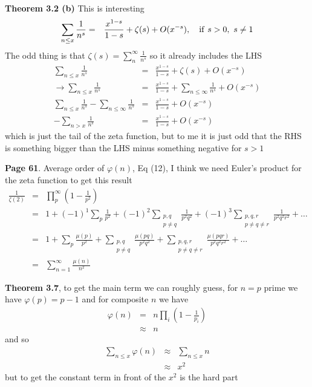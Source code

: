 \documentclass[aps,preprint,preprintnumbers,nofootinbib,showpacs,prd]{revtex4-1}
\newcommand{\nbea}{\begin{eqnarray*}}
\newcommand{\neea}{\end{eqnarray*}}
\begin{document}
{\bf Theorem 3.2 (b)} This is interesting
%
\nbea
\sum_{n\le x}\frac{1}{n^s} & = & \frac{x^{1-s}}{1-s} + \zeta(s) + O(x^{-s}), ~~~{\rm if~} s> 0,~s\neq1
\neea
%
The odd thing is that $\zeta(s) = \sum_{n}^\infty \frac{1}{n^s}$ so it already includes the LHS
%
\nbea
\sum_{n\le x}\frac{1}{n^s} & = & \frac{x^{1-s}}{1-s} + \zeta(s) + O(x^{-s}) \\
\to \sum_{n\le x}\frac{1}{n^s} & = & \frac{x^{1-s}}{1-s} + \sum_{n\le \infty}\frac{1}{n^s} + O(x^{-s}) \\
\sum_{n\le x}\frac{1}{n^s} - \sum_{n\le \infty}\frac{1}{n^s} & = & \frac{x^{1-s}}{1-s} + O(x^{-s}) \\
-\sum_{n > x}\frac{1}{n^s} & = & \frac{x^{1-s}}{1-s} + O(x^{-s})
\neea
%
which is just the tail of the zeta function, but to me it is just odd that the RHS is something bigger than the LHS minus something negative for $s > 1$



{\bf Page 61}. Average order of $\varphi(n)$, Eq (12), I think we need Euler's product for the zeta function to get this result
%
\nbea
\frac{1}{\zeta(2)} & = & \prod_p^\infty \left(1-\frac{1}{p^2}\right) \\
& = & 1 + (-1)^1\sum_{p} \frac{1}{p^2} + (-1)^2\sum_{\substack{p,q\\p\neq q}} \frac{1}{p^2q^2} + (-1)^3\sum_{\substack{p,q,r\\p\neq q \neq r}} \frac{1}{p^2q^2r^2} + \ldots \\
& = & 1 + \sum_{p} \frac{\mu(p)}{p^2} + \sum_{\substack{p,q\\p\neq q}} \frac{\mu(pq)}{p^2q^2} + \sum_{\substack{p,q,r\\p\neq q \neq r}} \frac{\mu(pqr)}{p^2q^2r^2} + \ldots \\
& = & \sum_{n=1}^\infty \frac{\mu(n)}{n^2}
\neea
%

{\bf Theorem 3.7}, to get the main term we can roughly guess, for $n=p$ prime we have $\varphi(p) = p-1$ and for composite $n$ we have
%
\nbea
\varphi(n) & = & n\prod_i\left(1-\frac{1}{p_i}\right) \\
& \approx & n
\neea
%
and so
%
\nbea
\sum_{n\le x} \varphi(n) & \approx & \sum_{n \le x} n \\
& \approx & x^2
\neea
%
but to get the constant term in front of the $x^2$ is the hard part
\end{document}
